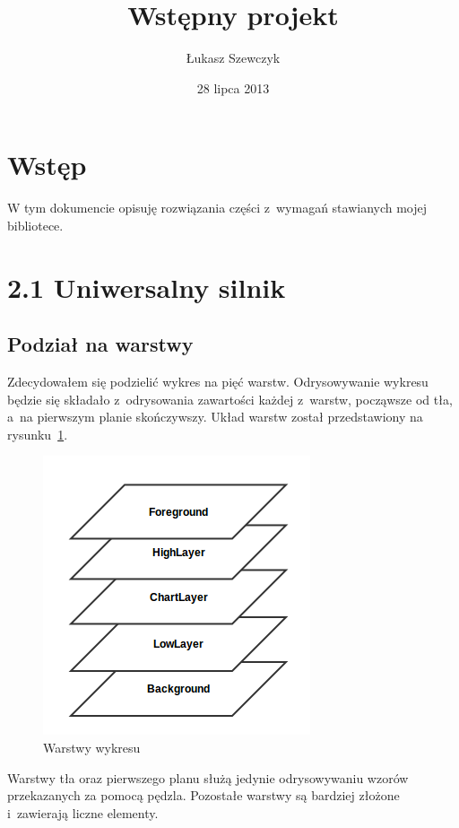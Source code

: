\documentclass[11pt,twoside,a4paper,final]{llncs}
\begin{document}
\date{28 lipca 2013}
\title{Wstępny projekt}

\author{Łukasz Szewczyk}
\maketitle


\section{Wstęp}
W tym dokumencie opisuję rozwiązania części z~wymagań stawianych mojej bibliotece.

\section{2.1 Uniwersalny silnik}
\subsection{Podział na warstwy}
Zdecydowałem się podzielić wykres na pięć warstw. Odrysowywanie wykresu będzie się składało z~odrysowania zawartości każdej z~warstw, począwsze od tła, a~na pierwszym planie skończywszy.
Układ warstw został przedstawiony na rysunku~\ref{rys:warstwy}.

\begin{figure}
\centering
\caption{Warstwy wykresu}\label{rys:warstwy}
\includegraphics[scale=0.6]{warstwy.png}
\end{figure}

Warstwy tła oraz pierwszego planu służą jedynie odrysowywaniu wzorów przekazanych za pomocą pędzla. Pozostałe warstwy są bardziej złożone i~zawierają liczne elementy.
\end{document}
